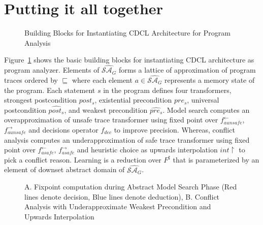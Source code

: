 \section{Putting it all together}
%
\begin{figure}[htbp]
\centering
\vspace*{-0.2cm}
\caption{Building Blocks for Instantiating CDCL Architecture for Program
  Analysis \label{schema}}
\end{figure}
%
Figure~\ref{schema} shows the basic building blocks for instantiating CDCL 
architecture as program analyzer.  Elements of
$\widehat{\mathcal{SA}_{G}}$ forms a lattice of approximation of program traces
ordered by $\sqsubseteq$ where each element $a \in \widehat{\mathcal{SA}_{G}}$ 
represents a memory state of the program.  Each statement $s$ in the program
defines four transformers, strongest postcondition $post_s$, existential precondition 
$pre_s$, universal postcondition $\widehat{post_s}$, and weakest precondition 
$\widehat{pre_s}$.  Model search computes an overapproximation of unsafe trace 
transformer using fixed point over $f_{aunsafe}^{\leftarrow}$, $f_{aunsafe}^{\rightarrow}$ 
and decisions operator $f_{dec}$ to improve precision.  
Whereas, conflict analysis computes an underapproximation of safe trace transformer 
using fixed point over $f_{asafe}^{\leftarrow}$, $f_{asafe}^{\rightarrow}$ and
heuristic choice as upwards interpolation $int\upharpoonright$ to pick a conflict reason.
Learning is a reduction over $F^{\sharp}$ that is parameterized by an element of
downset abstract domain of $\widehat{\mathcal{SA}_{G}}$.
%
\begin{figure}[t]
\begin{minipage}{4cm}
\centering
{}
  \label{model-fixpoint}
\end{minipage}%
\hspace{10em}%
\begin{minipage}{4.0cm}
\centering
{}
\label{conflict-fixpoint}
\end{minipage}
  \caption {
  A. Fixpoint computation during Abstract Model Search Phase (Red lines denote
  decision, Blue lines denote deduction), B. Conflict Analysis with 
  Underapproximate Weakest Precondition and Upwards Interpolation
  \label{fixpoint}}
\end{figure}
%

